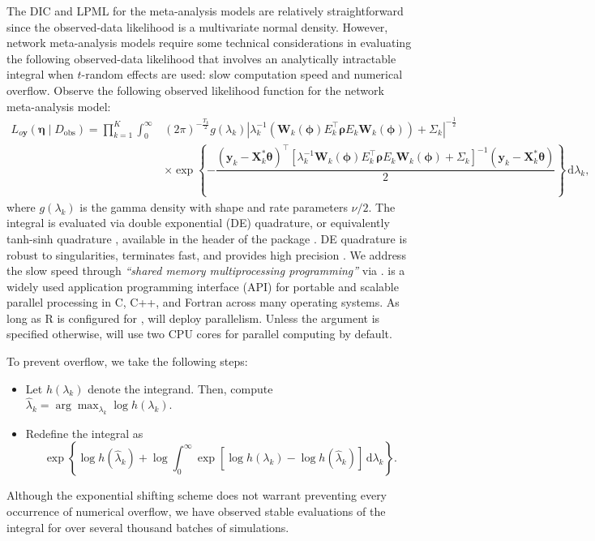 The DIC and LPML for the meta-analysis models are relatively straightforward since the observed-data likelihood is a multivariate normal density. However, network meta-analysis models require some technical considerations in evaluating the following observed-data likelihood that involves an analytically intractable integral when $t$-random effects are used: slow computation speed and numerical overflow. Observe the following observed likelihood function for the network meta-analysis model:
\begin{align*}
  L_{o\mathbf{y}}(\bm{\eta}\mid D_\text{obs}) = \prod_{k=1}^K \int_0^\infty &(2\pi)^{-\frac{T_k}{2}}g(\lambda_k)\left| \lambda_k^{-1}(\bm{W}_k(\bm{\phi})E_k^\top\bm{\rho}E_k \bm{W}_k(\bm{\phi})) + \Sigma_k \right|^{-\frac{1}{2}}\\
    &\times \exp\left\{-\dfrac{(\bm{y}_k - \bm{X}_k^*\bm{\theta})^\top\left[\lambda_k^{-1}\bm{W}_k(\bm{\phi})E_k^\top \bm{\rho}E_k \bm{W}_k(\bm{\phi})+\Sigma_k \right]^{-1}(\bm{y}_k - \bm{X}_k^*\bm{\theta})}{2}\right\}\,\mathrm{d}\lambda_k,
\end{align*}
where $g(\lambda_k)$ is the gamma density with shape and rate parameters $\nu/2$.
The integral is evaluated via double exponential (DE) quadrature, or equivalently tanh-sinh quadrature \citep{takahasi1974double,Bailey2005}, available in the  header of the  package \citep{BHboost2019}. DE quadrature is robust to singularities, terminates fast, and provides high precision \citep{Bailey2005}. We address the slow speed through \emph{``shared memory multiprocessing programming''} via  \citep{openmp18}.  is a widely used application programming interface (API) for portable and scalable parallel processing in {C}, {C++}, and {Fortran} across many operating systems. As long as R is configured for ,  will deploy parallelism. Unless the argument  is specified otherwise,  will use two CPU cores for parallel computing by default.

To prevent overflow, we take the following steps:
\begin{itemize}
   \item Let $h(\lambda_k)$ denote the integrand. Then, compute \(\widehat{\lambda}_k = \arg\max_{\lambda_k} \log h(\lambda_k)\).
   \item Redefine the integral as
   \[
    \exp\left\{\log h(\widehat{\lambda}_k) + \log \int_0^\infty\exp\left[\log h(\lambda_k) - \log h(\widehat{\lambda}_k) \right]\,\mathrm{d}\lambda_k\right\}.
   \]
 \end{itemize}
 Although the exponential shifting scheme does not warrant preventing every occurrence of numerical overflow, we have observed stable evaluations of the integral for over several thousand batches of simulations.


